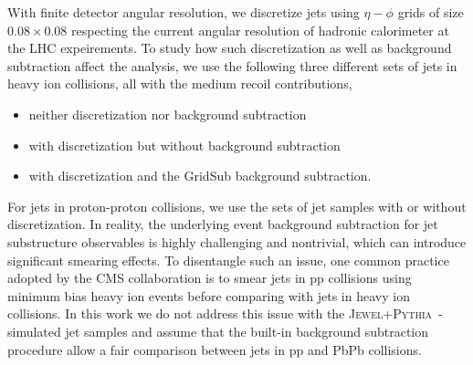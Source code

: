 \documentclass[notoc]{JHEP3}
\newcommand{\jw}{\textsc{Jewel}~}
\newcommand{\jwpy}{\textsc{Jewel+Pythia}~}
\begin{document}

With finite detector angular resolution, we discretize jets using $\eta-\phi$ grids of size $0.08 \times 0.08$ respecting the current angular resolution of hadronic calorimeter at the LHC expeirements. To study how such discretization as well as background subtraction affect the analysis, we use the following three different sets of jets in heavy ion collisions, all with the medium recoil contributions,
\begin{itemize}
    \item neither discretization nor background subtraction
	\item with discretization but without background subtraction
	\item with discretization and the GridSub background subtraction.
\end{itemize}
For jets in proton-proton collisions, we use the sets of jet samples with or without discretization. In reality, the underlying event background subtraction for jet substructure observables is highly challenging and nontrivial, which can introduce significant smearing effects. To disentangle such an issue, one common practice adopted by the CMS collaboration is to smear jets in pp collisions using minimum bias heavy ion events before comparing with jets in heavy ion collisions. In this work we do not address this issue with the \jwpy-simulated jet samples and assume that the built-in background subtraction procedure allow a fair comparison between jets in pp and PbPb collisions. 
\end{document}
